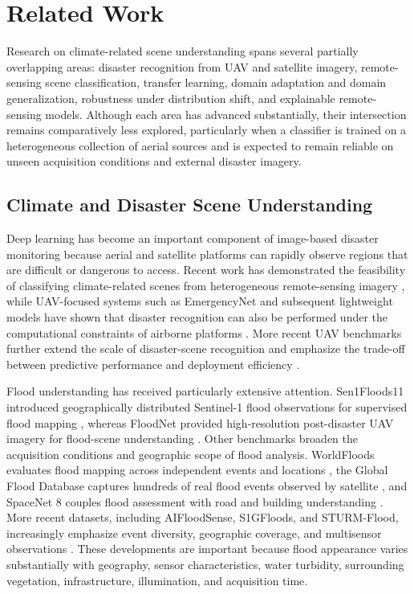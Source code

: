 \section{Related Work}
\label{sec:related_work}

Research on climate-related scene understanding spans several partially overlapping areas: disaster recognition from UAV and satellite imagery, remote-sensing scene classification, transfer learning, domain adaptation and domain generalization, robustness under distribution shift, and explainable remote-sensing models. Although each area has advanced substantially, their intersection remains comparatively less explored, particularly when a classifier is trained on a heterogeneous collection of aerial sources and is expected to remain reliable on unseen acquisition conditions and external disaster imagery.

\subsection{Climate and Disaster Scene Understanding}

Deep learning has become an important component of image-based disaster monitoring because aerial and satellite platforms can rapidly observe regions that are difficult or dangerous to access. Recent work has demonstrated the feasibility of classifying climate-related scenes from heterogeneous remote-sensing imagery \cite{vanexel2025climate}, while UAV-focused systems such as EmergencyNet and subsequent lightweight models have shown that disaster recognition can also be performed under the computational constraints of airborne platforms \cite{kyrkou2020emergencynet,xinjie2024lightweight}. More recent UAV benchmarks further extend the scale of disaster-scene recognition and emphasize the trade-off between predictive performance and deployment efficiency \cite{shianios2026uavdisaster36k,alsaaran2025earthquakeuav}.

Flood understanding has received particularly extensive attention. Sen1Floods11 introduced geographically distributed Sentinel-1 flood observations for supervised flood mapping \cite{bonafilia2020sen1floods11}, whereas FloodNet provided high-resolution post-disaster UAV imagery for flood-scene understanding \cite{rahnemoonfar2021floodnet}. Other benchmarks broaden the acquisition conditions and geographic scope of flood analysis. WorldFloods evaluates flood mapping across independent events and locations \cite{mateogarcia2021worldfloods}, the Global Flood Database captures hundreds of real flood events observed by satellite \cite{tellman2021globalflood}, and SpaceNet 8 couples flood assessment with road and building understanding \cite{hansch2022spacenet8}. More recent datasets, including AIFloodSense, S1GFloods, and STURM-Flood, increasingly emphasize event diversity, geographic coverage, and multisensor observations \cite{simantiris2026aifloodsense,saleh2024damnet,notarangelo2025sturm}. These developments are important because flood appearance varies substantially with geography, sensor characteristics, water turbidity, surrounding vegetation, infrastructure, illumination, and acquisition time.


